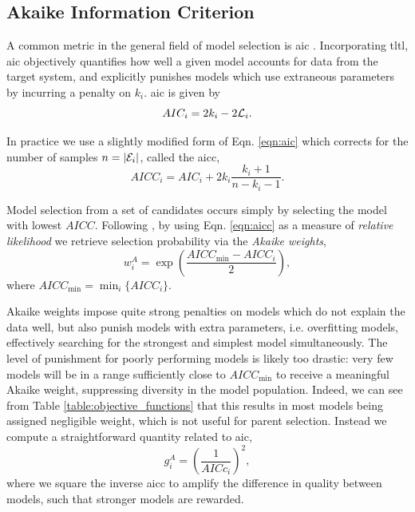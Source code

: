 \subsection{Akaike Information Criterion}\label{sec:akaike_info_criterion}
A common metric in the general field of model selection is \gls{aic} \cite{dr2002model}.
Incorporating \gls{tltl}, 
    \gls{aic} objectively quantifies how well a given model accounts for data from the target system,
    and explicitly punishes models which use extraneous parameters by incurring a penalty on $k_i$. 
\gls{aic} is given by 
\begin{equation}
    \label{eqn:aic}
    AIC_i = 2k_i - 2 {\mathcal{L}}_{i}.
\end{equation}

In practice we use a slightly modified form of Eqn. \ref{eqn:aic} which
    corrects for the number of samples $n=\lvert{ \mathcal{E} }_i\rvert$, 
    called the \gls{aicc}, 
\begin{equation}
    \label{eqn:aicc}
    AICC_i = AIC_i + 2k_i \frac{k_i+1}{n-k_i-1}. 
\end{equation}

Model selection from a set of candidates occurs simply by selecting the model with lowest $AICC$.
Following \cite{dr2002}, by using Eqn. \ref{eqn:aicc} as a measure of \emph{relative likelihood}
    we retrieve selection probability via
    the \emph{Akaike weights},
\begin{equation}
    \label{eqn:akaike_weights}
    w_i^A = \exp \left( \frac{{AICC_{\textrm{min}} - AICC_i}}{2} \right), 
\end{equation}
    where $AICC_{\textrm{min}} = \min_{i}\{ AICC_i\}$.

Akaike weights impose quite strong penalties 
    on models which do not explain the data well, 
    but also punish models with extra parameters, i.e. overfitting models, 
    effectively searching for the strongest and simplest model simultaneously.
The level of punishment for poorly performing models is likely too drastic: 
    very few models will be in a range sufficiently close to $AICC_{\textrm{min}}$ 
    to receive a meaningful Akaike weight, 
    suppressing diversity in the model population.
    Indeed, we can see from Table \ref{table:objective_functions} that this results in most 
    models being assigned negligible weight, which is not useful for parent selection. 
Instead we compute a straightforward quantity related to \gls{aic},
\begin{equation}
    \label{eqn:akaike_fitness}
    g_i^{A} = \left(\frac{1}{AICc_i}\right)^2,
\end{equation}
    where we square the inverse \gls{aicc} to amplify the difference in quality between models, 
    such that stronger models are rewarded.

